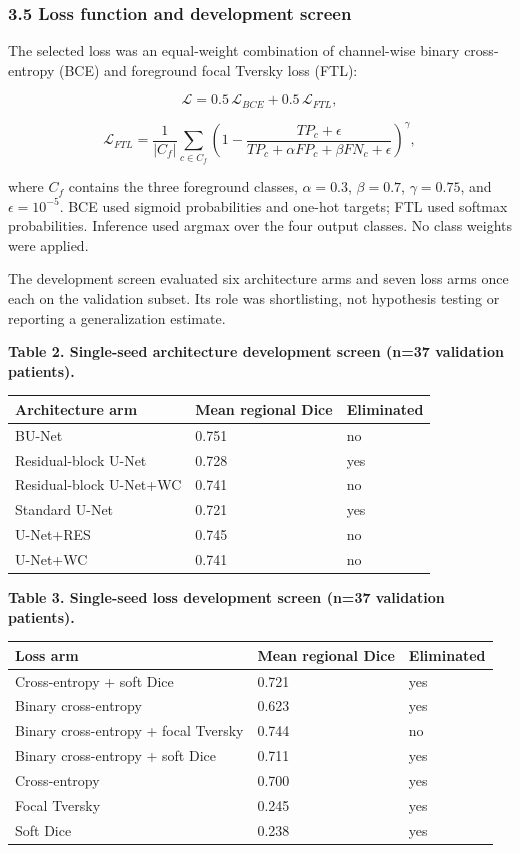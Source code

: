 \documentclass[
  10pt,
  letterpaper,
]{article}
\newcounter{none} %
\begin{document}
\subsubsection{3.5 Loss function and development
screen}\label{loss-function-and-development-screen}

The selected loss was an equal-weight combination of channel-wise binary
cross-entropy (BCE) and foreground focal Tversky loss (FTL):

\[
\mathcal{L} = 0.5\,\mathcal{L}_{BCE} + 0.5\,\mathcal{L}_{FTL},
\]

\[
\mathcal{L}_{FTL} =
\frac{1}{|C_f|}\sum_{c\in C_f}
\left(1-
\frac{TP_c+\epsilon}{TP_c+\alpha FP_c+\beta FN_c+\epsilon}
\right)^\gamma ,
\]

where \(C_f\) contains the three foreground classes, \(\alpha=0.3\),
\(\beta=0.7\), \(\gamma=0.75\), and \(\epsilon=10^{-5}\). BCE used
sigmoid probabilities and one-hot targets; FTL used softmax
probabilities. Inference used argmax over the four output classes. No
class weights were applied.

The development screen evaluated six architecture arms and seven loss
arms once each on the validation subset. Its role was shortlisting, not
hypothesis testing or reporting a generalization estimate.

\textbf{Table 2. Single-seed architecture development screen (n=37
validation patients).}

{\def\LTcaptype{none} %
\begin{longtable}[]{@{}lll@{}}
\toprule\noalign{}
Architecture arm & Mean regional Dice & Eliminated \\
\midrule\noalign{}
\endhead
\bottomrule\noalign{}
\endlastfoot
BU-Net & 0.751 & no \\
Residual-block U-Net & 0.728 & yes \\
Residual-block U-Net+WC & 0.741 & no \\
Standard U-Net & 0.721 & yes \\
U-Net+RES & 0.745 & no \\
U-Net+WC & 0.741 & no \\
\end{longtable}
}

\textbf{Table 3. Single-seed loss development screen (n=37 validation
patients).}

{\def\LTcaptype{none} %
\begin{longtable}[]{@{}lll@{}}
\toprule\noalign{}
Loss arm & Mean regional Dice & Eliminated \\
\midrule\noalign{}
\endhead
\bottomrule\noalign{}
\endlastfoot
Cross-entropy + soft Dice & 0.721 & yes \\
Binary cross-entropy & 0.623 & yes \\
Binary cross-entropy + focal Tversky & 0.744 & no \\
Binary cross-entropy + soft Dice & 0.711 & yes \\
Cross-entropy & 0.700 & yes \\
Focal Tversky & 0.245 & yes \\
Soft Dice & 0.238 & yes \\
\end{longtable}
}
\end{document}
